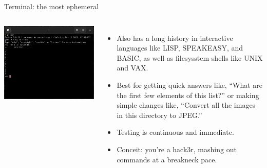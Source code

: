 \documentclass[aspectratio=169]{beamer}
\begin{document}
\begin{frame}{Terminal: the most ephemeral}
\vspace{0.2 cm}
\begin{columns}
\includegraphics[width=\linewidth]{../img/fundamental-3-modes-terminal.png}

\large
\begin{itemize}\setlength{\itemsep}{0.25 cm}
\item<1-> Also has a long history in interactive languages like LISP, SPEAKEASY, and BASIC, as well as filesysstem shells like UNIX and VAX.
\item<2-> Best for getting quick answers like, ``What are the first few elements of this list?'' or making simple changes like, ``Convert all the images in this directory to JPEG.''
\item<3-> Testing is continuous and immediate.
\item<4-> Conceit: you're a hack3r, mashing out commands at a breakneck pace.
\end{itemize}
\end{columns}
\end{frame}
\end{document}
